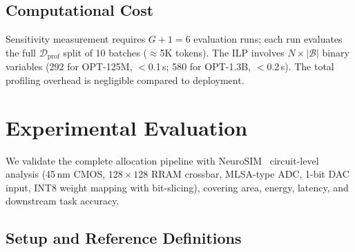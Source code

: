 \documentclass[sigconf,review,anonymous]{acmart}
\begin{document}
\subsection{Computational Cost}

Sensitivity measurement requires $G{+}1 = 6$ evaluation runs; each run evaluates the full $\mathcal{D}_\text{prof}$ split of 10 batches (${\approx}$5K tokens).
The ILP involves $N \times |\mathcal{B}|$ binary variables (292 for OPT-125M, $<$0.1\,s; 580 for OPT-1.3B, $<$0.2\,s).
The total profiling overhead is negligible compared to deployment.

\section{Experimental Evaluation}
\label{sec:results}

We validate the complete allocation pipeline with NeuroSIM~\cite{chen2018neurosim} circuit-level analysis (45\,nm CMOS, $128{\times}128$ RRAM crossbar, MLSA-type ADC, 1-bit DAC input, INT8 weight mapping with bit-slicing), covering area, energy, latency, and downstream task accuracy.

\subsection{Setup and Reference Definitions}
\end{document}
